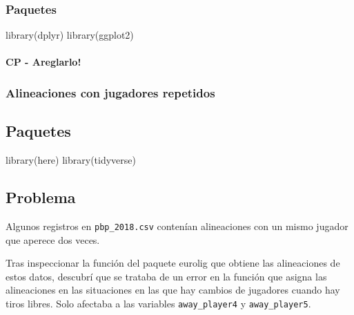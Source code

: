 \documentclass[
]{article}
\newenvironment{Shaded}{\begin{snugshade}}{\end{snugshade}}
\newcommand{\FunctionTok}[1]{\textcolor[rgb]{0.00,0.00,0.00}{#1}}
\newcommand{\NormalTok}[1]{#1}
\begin{document}
\hypertarget{paquetes}{%
\subsubsection{Paquetes}\label{paquetes}}

\begin{Shaded}
\begin{Highlighting}[]
\FunctionTok{library}\NormalTok{(dplyr)}
\FunctionTok{library}\NormalTok{(ggplot2)}
\end{Highlighting}
\end{Shaded}

\hypertarget{cp---areglarlo}{%
\paragraph{CP - Areglarlo!}\label{cp---areglarlo}}

\hypertarget{alineaciones-con-jugadores-repetidos}{%
\subsubsection{Alineaciones con jugadores
repetidos}\label{alineaciones-con-jugadores-repetidos}}

\hypertarget{paquetes-1}{%
\subsection{Paquetes}\label{paquetes-1}}

\begin{Shaded}
\begin{Highlighting}[]
\FunctionTok{library}\NormalTok{(here)}
\FunctionTok{library}\NormalTok{(tidyverse)}
\end{Highlighting}
\end{Shaded}

\hypertarget{problema}{%
\subsection{Problema}\label{problema}}

Algunos registros en \texttt{pbp\_2018.csv} contenían alineaciones con
un mismo jugador que aperece dos veces.

Tras inspeccionar la función del paquete eurolig que obtiene las
alineaciones de estos datos, descubrí que se trataba de un error en la
función que asigna las alineaciones en las situaciones en las que hay
cambios de jugadores cuando hay tiros libres. Solo afectaba a las
variables \texttt{away\_player4} y \texttt{away\_player5}.
\end{document}
